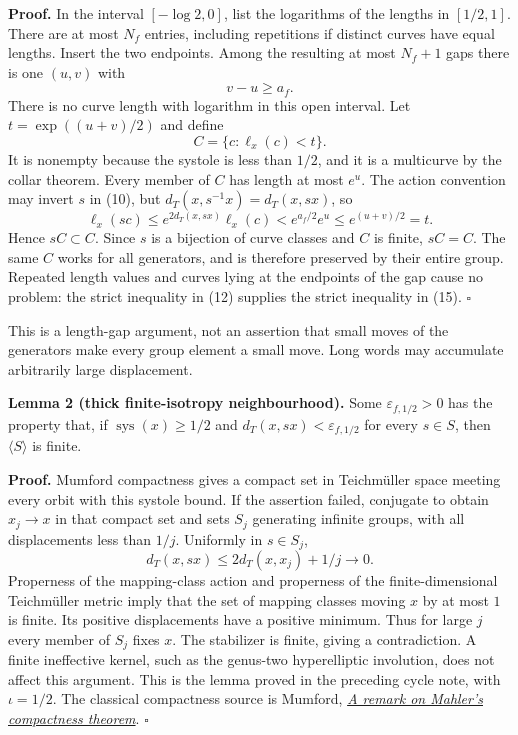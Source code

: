 \documentclass[
  11pt,
]{article}
\begin{document}
\textbf{Proof.} In the interval \([-\log2,0]\), list the logarithms of
the lengths in \([1/2,1]\). There are at most \(N_f\) entries, including
repetitions if distinct curves have equal lengths. Insert the two
endpoints. Among the resulting at most \(N_f+1\) gaps there is one
\((u,v)\) with \[
                            v-u\ge a_f.                       \tag{13}
\] There is no curve length with logarithm in this open interval. Let
\(t=\exp((u+v)/2)\) and define \[
                            C=\{c:\ell_x(c)<t\}.              \tag{14}
\] It is nonempty because the systole is less than \(1/2\), and it is a
multicurve by the collar theorem. Every member of \(C\) has length at
most \(e^u\). The action convention may invert \(s\) in (10), but
\(d_T(x,s^{-1}x)=d_T(x,sx)\), so \[
 \ell_x(sc)\le e^{2d_T(x,sx)}\ell_x(c)
     < e^{a_f/2}e^u\le e^{(u+v)/2}=t.                        \tag{15}
\] Hence \(sC\subset C\). Since \(s\) is a bijection of curve classes
and \(C\) is finite, \(sC=C\). The same \(C\) works for all generators,
and is therefore preserved by their entire group. Repeated length values
and curves lying at the endpoints of the gap cause no problem: the
strict inequality in (12) supplies the strict inequality in (15).
\(\square\)

This is a length-gap argument, not an assertion that small moves of the
generators make every group element a small move. Long words may
accumulate arbitrarily large displacement.

\textbf{Lemma 2 (thick finite-isotropy neighbourhood).} Some
\(\varepsilon_{f,1/2}>0\) has the property that, if
\(\operatorname{sys}(x)\ge1/2\) and \(d_T(x,sx)<\varepsilon_{f,1/2}\)
for every \(s\in S\), then \(\langle S\rangle\) is finite.

\textbf{Proof.} Mumford compactness gives a compact set in Teichmüller
space meeting every orbit with this systole bound. If the assertion
failed, conjugate to obtain \(x_j\to x\) in that compact set and sets
\(S_j\) generating infinite groups, with all displacements less than
\(1/j\). Uniformly in \(s\in S_j\), \[
                  d_T(x,sx)\le2d_T(x,x_j)+1/j\longrightarrow0.
\tag{16}
\] Properness of the mapping-class action and properness of the
finite-dimensional Teichmüller metric imply that the set of mapping
classes moving \(x\) by at most \(1\) is finite. Its positive
displacements have a positive minimum. Thus for large \(j\) every member
of \(S_j\) fixes \(x\). The stabilizer is finite, giving a
contradiction. A finite ineffective kernel, such as the genus-two
hyperelliptic involution, does not affect this argument. This is the
lemma proved in the preceding cycle note, with \(\iota=1/2\). The
classical compactness source is Mumford,
\href{https://doi.org/10.2307/2037802}{\emph{A remark on Mahler's
compactness theorem}}. \(\square\)
\end{document}
